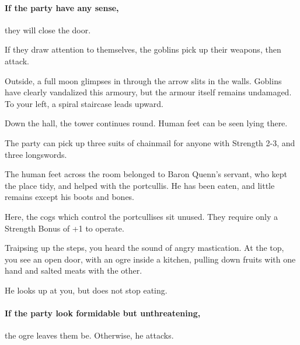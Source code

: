 \begin{multicols}{2}
\paragraph{If the party have any sense,}
they will close the door.

If they draw attention to themselves, the goblins pick up their weapons, then attack.

\goblin


\begin{boxtext}

	Outside, a full moon glimpses in through the arrow slits in the walls.
	Goblins have clearly vandalized this armoury, but the armour itself remains undamaged.
	To your left, a spiral staircase leads upward.

	Down the hall, the tower continues round.
	Human feet can be seen lying there.

\end{boxtext}


The party can pick up three suits of chainmail for anyone with Strength 2-3, and three longswords.

The human feet across the room belonged to Baron Quenn's servant, who kept the place tidy, and helped with the portcullis.
He has been eaten, and little remains except his boots and bones.


Here, the cogs which control the portcullises sit unused.
They require only a Strength Bonus of +1 to operate.


\begin{boxtext}

	Traipsing up the steps, you heard the sound of angry mastication.
	At the top, you see an open door, with an ogre inside a kitchen, pulling down fruits with one hand and salted meats with the other.

	He looks up at you, but does not stop eating.

\end{boxtext}

\paragraph{If the party look formidable but unthreatening,}
the ogre leaves them be.
Otherwise, he attacks.


\end{multicols}
